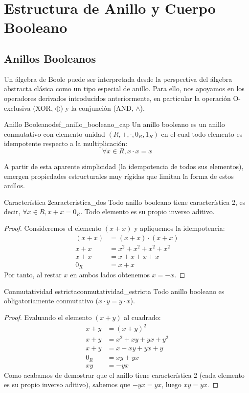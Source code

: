 \chapter{Estructura de Anillo y Cuerpo Booleano}

\section{Anillos Booleanos}
Un álgebra de Boole puede ser interpretada desde la perspectiva del álgebra abstracta clásica como un tipo especial de anillo. Para ello, nos apoyamos en los operadores derivados introducidos anteriormente, en particular la operación O-exclusiva (XOR, $\oplus$) y la conjunción (AND, $\wedge$).

\begin{definicion}{Anillo Booleano}{def_anillo_booleano_cap}
Un anillo booleano es un anillo conmutativo con elemento unidad $(R, +, \cdot, 0_R, 1_R)$ en el cual todo elemento es idempotente respecto a la multiplicación:
\[ \forall x \in R, x \cdot x = x \]
\end{definicion}

A partir de esta aparente simplicidad (la idempotencia de todos sus elementos), emergen propiedades estructurales muy rígidas que limitan la forma de estos anillos.

\begin{teorema}{Característica 2}{caracteristica_dos}
Todo anillo booleano tiene característica 2, es decir, $\forall x \in R, x + x = 0_R$. Todo elemento es su propio inverso aditivo.
\end{teorema}
\begin{proof}
Consideremos el elemento $(x+x)$ y apliquemos la idempotencia:
\begin{align*}
(x + x) &= (x + x) \cdot (x + x) \\
x + x &= x^2 + x^2 + x^2 + x^2 \\
x + x &= x + x + x + x \\
0_R &= x + x
\end{align*}
Por tanto, al restar $x$ en ambos lados obtenemos $x = -x$.
\end{proof}

\begin{teorema}{Conmutatividad estricta}{conmutatividad_estricta}
Todo anillo booleano es obligatoriamente conmutativo ($x \cdot y = y \cdot x$).
\end{teorema}
\begin{proof}
Evaluando el elemento $(x+y)$ al cuadrado:
\begin{align*}
x + y &= (x + y)^2 \\
x + y &= x^2 + xy + yx + y^2 \\
x + y &= x + xy + yx + y \\
0_R &= xy + yx \\
xy &= -yx
\end{align*}
Como acabamos de demostrar que el anillo tiene característica 2 (cada elemento es su propio inverso aditivo), sabemos que $-yx = yx$, luego $xy = yx$.
\end{proof}

